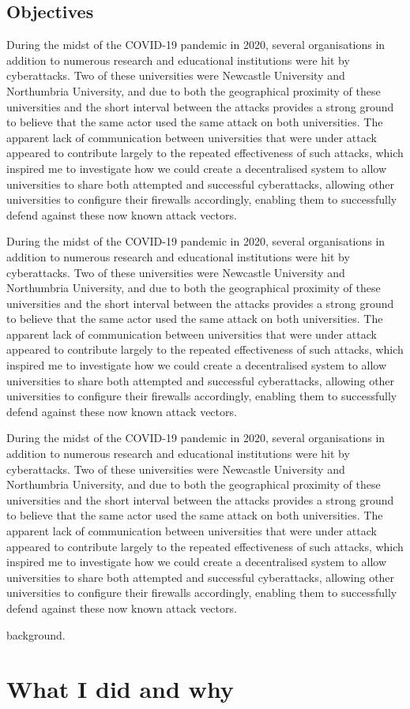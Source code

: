 \documentclass[a4paper]{report}
\begin{document}
\section{Objectives}
During the midst of the COVID-19 pandemic in 2020, several organisations in addition to numerous research and educational institutions were hit by cyberattacks. Two of these universities were Newcastle University and Northumbria University, and due to both the geographical proximity of these universities and the short interval between the attacks provides a strong ground to believe that the same actor used the same attack on both universities.
The apparent lack of communication between universities that were under attack appeared to contribute largely to the repeated effectiveness of such attacks, which inspired me to investigate how we could create a decentralised system to allow universities to share both attempted and successful cyberattacks, allowing other universities to configure their firewalls accordingly, enabling them to successfully defend against these now known attack vectors.

During the midst of the COVID-19 pandemic in 2020, several organisations in addition to numerous research and educational institutions were hit by cyberattacks. Two of these universities were Newcastle University and Northumbria University, and due to both the geographical proximity of these universities and the short interval between the attacks provides a strong ground to believe that the same actor used the same attack on both universities.
The apparent lack of communication between universities that were under attack appeared to contribute largely to the repeated effectiveness of such attacks, which inspired me to investigate how we could create a decentralised system to allow universities to share both attempted and successful cyberattacks, allowing other universities to configure their firewalls accordingly, enabling them to successfully defend against these now known attack vectors.

During the midst of the COVID-19 pandemic in 2020, several organisations in addition to numerous research and educational institutions were hit by cyberattacks. Two of these universities were Newcastle University and Northumbria University, and due to both the geographical proximity of these universities and the short interval between the attacks provides a strong ground to believe that the same actor used the same attack on both universities.
The apparent lack of communication between universities that were under attack appeared to contribute largely to the repeated effectiveness of such attacks, which inspired me to investigate how we could create a decentralised system to allow universities to share both attempted and successful cyberattacks, allowing other universities to configure their firewalls accordingly, enabling them to successfully defend against these now known attack vectors.


background.

\chapter{What I did and why}

 

\end{document}
